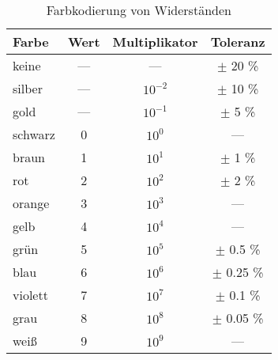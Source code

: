 \begin{table}
    \centering
    \caption{Farbkodierung von Widerständen}
    \label{tab:label}
    \begin{tabular}{l c c c}
        \toprule
        Farbe & Wert & Multiplikator & Toleranz \\
        \midrule
        keine   & ---   & ---       & $\pm$ 20 \% \\
        silber  & ---   & $10^{-2}$ & $\pm$ 10 \% \\
        gold    & ---   & $10^{-1}$ & $\pm$ 5 \% \\
        schwarz & 0     & $10^{0}$  &  --- \\
        braun   & 1     & $10^{1}$  &  $\pm$ 1 \% \\
        rot     & 2     & $10^{2}$  &  $\pm$ 2 \% \\
        orange  & 3     & $10^{3}$  &  --- \\
        gelb    & 4     & $10^{4}$  &  --- \\
        grün    & 5     & $10^{5}$  &  $\pm$ 0.5 \% \\
        blau    & 6     & $10^{6}$  &  $\pm$ 0.25 \% \\
        violett & 7     & $10^{7}$  &  $\pm$ 0.1 \% \\
        grau    & 8     & $10^{8}$  &  $\pm$ 0.05 \% \\
        weiß    & 9     & $10^{9}$  &  --- \\
        \bottomrule
    \end{tabular}
\end{table}
